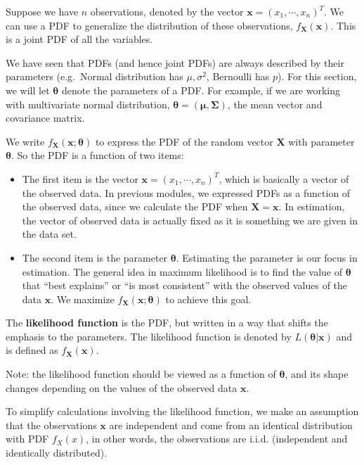 \documentclass[
]{book}
\begin{document}
Suppose we have \(n\) observations, denoted by the vector \(\boldsymbol{x} = (x_1, \cdots, x_n)^{T}\). We can use a PDF to generalize the distribution of these observations, \(f_{\boldsymbol{X}}(\boldsymbol{x})\). This is a joint PDF of all the variables.

We have seen that PDFs (and hence joint PDFs) are always described by their parameters (e.g.~Normal distribution has \(\mu, \sigma^2\), Bernoulli has \(p\)). For this section, we will let \(\boldsymbol{\theta}\) denote the parameters of a PDF. For example, if we are working with multivariate normal distribution, \(\boldsymbol{\theta} = (\boldsymbol{\mu}, \boldsymbol{\Sigma})\), the mean vector and covariance matrix.

We write \(f_{\boldsymbol{X}}(\boldsymbol{x}; \boldsymbol{\theta})\)
to express the PDF of the random vector \(\boldsymbol{X}\) with parameter \(\boldsymbol{\theta}\). So the PDF is a function of two items:

\begin{itemize}
\item
  The first item is the vector \(\boldsymbol{x} = (x_1, \cdots, x_n)^{T}\), which is basically a vector of the observed data. In previous modules, we expressed PDFs as a function of the observed data, since we calculate the PDF when \(\boldsymbol{X} = \boldsymbol{x}\). In estimation, the vector of observed data is actually fixed as it is something we are given in the data set.
\item
  The second item is the parameter \(\boldsymbol{\theta}\). Estimating the parameter is our focus in estimation. The general idea in maximum likelihood is to find the value of \(\boldsymbol{\theta}\) that ``best explains'' or ``is most consistent'' with the observed values of the data \(\boldsymbol{x}\). We maximize \(f_{\boldsymbol{X}}(\boldsymbol{x}; \boldsymbol{\theta})\) to achieve this goal.
\end{itemize}

The \textbf{likelihood function} is the PDF, but written in a way that shifts the emphasis to the parameters. The likelihood function is denoted by \(L(\boldsymbol{\theta} | \boldsymbol{x})\) and is defined as \(f_{\boldsymbol{X}}(\boldsymbol{x})\).

Note: the likelihood function should be viewed as a function of \(\boldsymbol{\theta}\), and its shape changes depending on the values of the observed data \(\boldsymbol{x}\).

To simplify calculations involving the likelihood function, we make an assumption that the observations \(\boldsymbol{x}\) are independent and come from an identical distribution with PDF \(f_X(x)\), in other words, the observations are i.i.d. (independent and identically distributed).
\end{document}
